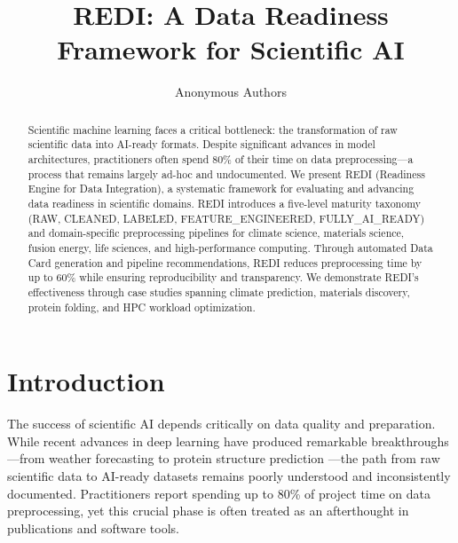 \documentclass[11pt,letterpaper,twocolumn]{article}
\title{\textbf{REDI: A Data Readiness Framework for Scientific AI}}
\author{
Anonymous Authors
}
\date{}
\begin{document}
\maketitle

\begin{abstract}
Scientific machine learning faces a critical bottleneck: the transformation of raw scientific data into AI-ready formats. Despite significant advances in model architectures, practitioners often spend 80\% of their time on data preprocessing---a process that remains largely ad-hoc and undocumented. We present REDI (Readiness Engine for Data Integration), a systematic framework for evaluating and advancing data readiness in scientific domains. REDI introduces a five-level maturity taxonomy (RAW, CLEANED, LABELED, FEATURE\_ENGINEERED, FULLY\_AI\_READY) and domain-specific preprocessing pipelines for climate science, materials science, fusion energy, life sciences, and high-performance computing. Through automated Data Card generation and pipeline recommendations, REDI reduces preprocessing time by up to 60\% while ensuring reproducibility and transparency. We demonstrate REDI's effectiveness through case studies spanning climate prediction, materials discovery, protein folding, and HPC workload optimization.
\end{abstract}

\section{Introduction}

The success of scientific AI depends critically on data quality and preparation. While recent advances in deep learning have produced remarkable breakthroughs---from weather forecasting \citep{climax2023} to protein structure prediction \citep{alphafold2021}---the path from raw scientific data to AI-ready datasets remains poorly understood and inconsistently documented. Practitioners report spending up to 80\% of project time on data preprocessing, yet this crucial phase is often treated as an afterthought in publications and software tools.
\end{document}
